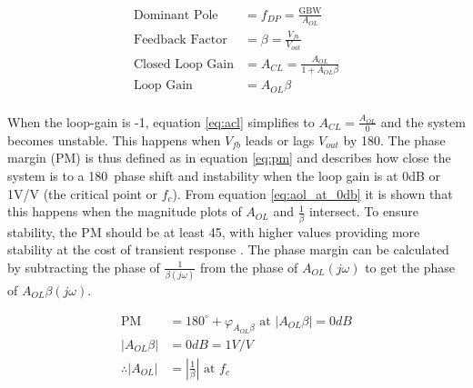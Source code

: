 \begin{align}
    \text{Dominant Pole} &= f_{DP} = \frac{\text{GBW}}{A_{OL}} \label{eq:fdp}\\
    \text{Feedback Factor} &= \beta = \frac{V_{fb}}{V_{out}}  \label{eq:fb_factor}\\
    \text{Closed Loop Gain} &= A_{CL} = \frac{A_{OL}}{1 + A_{OL}\beta} \label{eq:acl}\\
    \text{Loop Gain} &= A_{OL}\beta \label{eq:loop_gain}\\
\end{align}

When the loop-gain is -1, equation \ref{eq:acl} simplifies to $A_{CL} = \frac{A_{OL}}{0}$ and the system becomes unstable. This happens when $V_{fb}$ leads or lags $V_{out}$ by 180\textdegree. The phase margin (PM) is thus defined as in equation \ref{eq:pm} and describes how close the system is to a 180\textdegree\ phase shift and instability when the loop gain is at 0dB or 1V/V (the critical point or $f_c$). From equation \ref{eq:aol_at_0db} it is shown that this happens when the magnitude plots of $A_{OL}$ and $\frac{1}{\beta}$ intersect. To ensure stability, the PM should be at least 45\textdegree, with higher values providing more stability at the cost of transient response \cite{StabilizeYourTransimpedance}. The phase margin can be calculated by subtracting the phase of $\frac{1}{\beta(j\omega)}$ from the phase of $A_{OL}(j\omega)$ to get the phase of $A_{OL}\beta(j\omega)$.

\begin{align}
    \text{PM} &= 180^\circ + \varphi_{A_{OL}\beta} \text{ at } |A_{OL}\beta| = 0dB \label{eq:pm} \\
    |A_{OL}\beta| &= 0dB = 1 V/V\\
    \therefore |A_{OL}| &= |\frac{1}{\beta}| \text{ at } f_c \label{eq:aol_at_0db}
\end{align}

